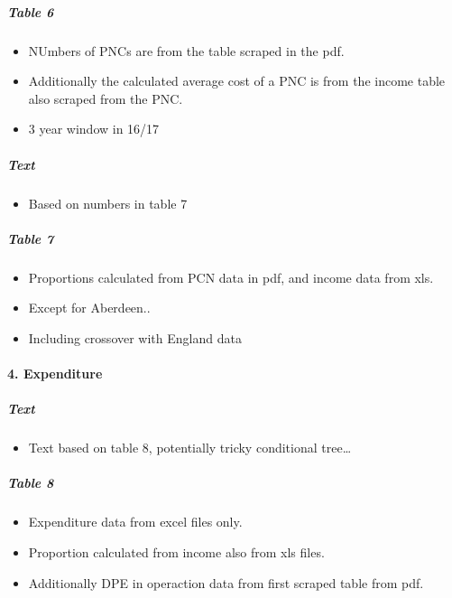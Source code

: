 \documentclass[]{article}
\providecommand{\tightlist}{%
  \setlength{\itemsep}{0pt}\setlength{\parskip}{0pt}}
\let\oldparagraph\paragraph
\renewcommand{\paragraph}[1]{\oldparagraph{#1}\mbox{}}
\let\oldsubparagraph\subparagraph
\renewcommand{\subparagraph}[1]{\oldsubparagraph{#1}\mbox{}}
\begin{document}
\hypertarget{table-6}{%
\subparagraph{Table 6}\label{table-6}}

\begin{itemize}
\tightlist
\item
  NUmbers of PNCs are from the table scraped in the pdf.
\item
  Additionally the calculated average cost of a PNC is from the income
  table also scraped from the PNC.
\item
  3 year window in 16/17
\end{itemize}

\hypertarget{text-6}{%
\subparagraph{Text}\label{text-6}}

\begin{itemize}
\tightlist
\item
  Based on numbers in table 7
\end{itemize}

\hypertarget{table-7}{%
\subparagraph{Table 7}\label{table-7}}

\begin{itemize}
\tightlist
\item
  Proportions calculated from PCN data in pdf, and income data from xls.
\item
  Except for Aberdeen..
\item
  Including crossover with England data
\end{itemize}

\hypertarget{expenditure}{%
\paragraph{4. Expenditure}\label{expenditure}}

\hypertarget{text-7}{%
\subparagraph{Text}\label{text-7}}

\begin{itemize}
\tightlist
\item
  Text based on table 8, potentially tricky conditional tree\ldots{}
\end{itemize}

\hypertarget{table-8}{%
\subparagraph{Table 8}\label{table-8}}

\begin{itemize}
\tightlist
\item
  Expenditure data from excel files only.
\item
  Proportion calculated from income also from xls files.
\item
  Additionally DPE in operaction data from first scraped table from pdf.
\end{itemize}
\end{document}

